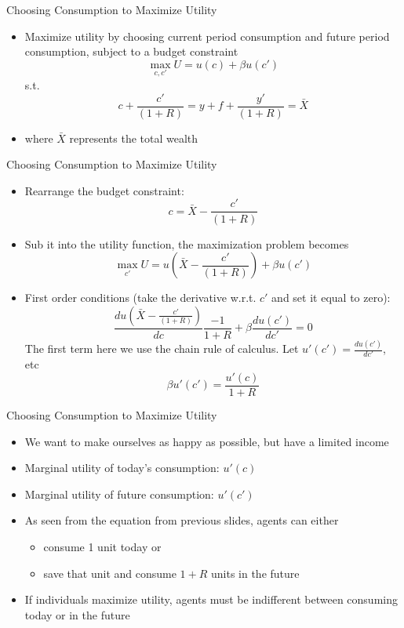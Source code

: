 \documentclass[aspectratio=1610]{beamer}
\begin{document}
\begin{frame}[wide]{Choosing Consumption to Maximize Utility}
	\begin{itemize}
		\item Maximize utility by choosing current period consumption and future period consumption, subject to a budget constraint
		\[\max_{c,c'} U = u(c) + \beta u(c')\]
		s.t.
		\[c+\frac{c'}{(1+R)}  = y +f + \frac{y'}{(1+R)} = \bar{X} \]
		\item[] where $\bar{X}$ represents the total wealth
	\end{itemize}
	
\end{frame}

\begin{frame}[wide]{Choosing Consumption to Maximize Utility}
	\begin{itemize}
		\item Rearrange the budget constraint:
		\[c  =\bar{X} -\frac{c'}{(1+R)}\]
		\item Sub it into the utility function, the maximization problem becomes
		\[\max_{c'} U = u\left(\bar{X} -\frac{c'}{(1+R)}\right) + \beta u(c')\]
		\item First order conditions (take the derivative w.r.t. $c'$ and set it equal to zero):
		\[\frac{d u\left(\bar{X} -\frac{c'}{(1+R)}\right)}{d c} \frac{-1}{1+R} + \beta \frac{du(c')}{dc'}=0\]
		The first term here we use the chain rule of calculus. Let $u'(c') = \frac{du(c')}{dc'}$, etc
		\[\beta u'(c')= \frac{u'(c)}{1+R}\]
		
	\end{itemize}
\end{frame}

\begin{frame}[wide]{Choosing Consumption to Maximize Utility}
	\begin{itemize}
		\item We want to make ourselves as happy as possible, but have a limited income
		\item Marginal utility of today’s consumption: $u'(c)$
		\item Marginal utility of future consumption: $u'(c')$
		\item As seen from the equation from previous slides, agents can either 
		\begin{itemize}
			\item consume 1 unit today or 
			\item save that unit and consume $1+R$ units in the future
		\end{itemize}
		\item If individuals maximize utility, agents must be indifferent between consuming today or in the future
	\end{itemize}
\end{frame}
\end{document}
